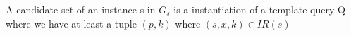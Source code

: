 \begin{definition}   A candidate set of an instance s in $G_s$ is a instantiation of a template query Q where we have at least a tuple $(p,k)$ where $(s,x,k) \in IR(s)$
\end{definition} 




